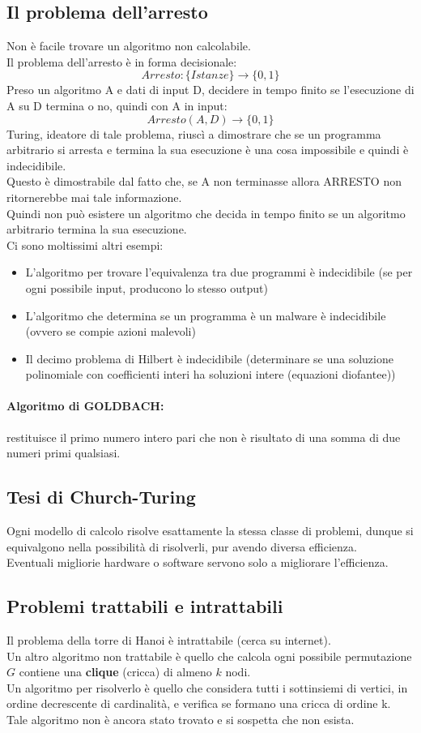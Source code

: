 \documentclass[a4paper,12pt]{article}
\begin{document}
\subsection{Il problema dell'arresto}
Non è facile trovare un algoritmo non calcolabile.\\
Il problema dell'arresto è in forma decisionale:
\[
Arresto: \{Istanze\} \to \{0,1\}
\]
Preso un algoritmo A e dati di input D, decidere in tempo finito se l'esecuzione di A su D termina o no, quindi con A in input:
\[
Arresto(A,D) \to \{0,1\}
\]
Turing, ideatore di tale problema, riuscì a dimostrare che se un programma arbitrario si arresta e termina la sua esecuzione è una cosa impossibile e quindi è indecidibile.\\
Questo è dimostrabile dal fatto che, se A non terminasse allora ARRESTO non ritornerebbe mai tale informazione.\\
Quindi non può esistere un algoritmo che decida in tempo finito se un algoritmo arbitrario termina la sua esecuzione.\\
Ci sono moltissimi altri esempi:
\begin{itemize}
    \item L'algoritmo per trovare l'equivalenza tra due programmi è indecidibile (se per ogni possibile input, producono lo stesso output)
    \item L'algoritmo che determina se un programma è un malware è indecidibile (ovvero se compie azioni malevoli)
    \item Il decimo problema di Hilbert è indecidibile (determinare se una soluzione polinomiale con coefficienti interi ha soluzioni intere (equazioni diofantee))
\end{itemize}
\paragraph{Algoritmo di GOLDBACH:} restituisce il primo numero intero pari che non è risultato di una somma di due numeri primi qualsiasi.
\subsection{Tesi di Church-Turing}
Ogni modello di calcolo risolve esattamente la stessa classe di problemi, dunque si equivalgono nella possibilità di risolverli, pur avendo diversa efficienza.\\
Eventuali migliorie hardware o software servono solo a migliorare l'efficienza.
\subsection{Problemi trattabili e intrattabili}
Il problema della torre di Hanoi è intrattabile (cerca su internet).\\
Un altro algoritmo non trattabile è quello che calcola ogni possibile permutazione$G$ contiene una \textbf{clique} (cricca) di almeno $k$ nodi.\\
Un algoritmo per risolverlo è quello che considera tutti i sottinsiemi di vertici, in ordine decrescente di cardinalità, e verifica se formano una cricca di ordine k.\\
Tale algoritmo non è ancora stato trovato e si sospetta che non esista.\\
\end{document}
